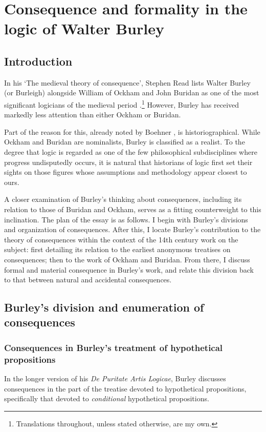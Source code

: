 \chapter[Consequence and formality in Burley]{Consequence and formality in the logic of Walter Burley}
	\section{Introduction}
	In his `The medieval theory of consequence', Stephen Read lists Walter Burley (or Burleigh) alongside William of Ockham and John Buridan as one of the most significant logicians of the medieval period .\footnote{\cite[p. 900]{Read2012} Translations throughout, unless stated otherwise, are my own.} However, Burley has received markedly less attention than either Ockham or Buridan. 
	
	Part of the reason for this, already noted by Boehner \autocite[p. VI]{Boehner1955}, is historiographical. While Ockham and Buridan are nominalists, Burley is classified as a realist. To the degree that logic is regarded as one of the few philosophical subdisciplines where progress undisputedly occurs, it is natural that historians of logic first set their sights on those figures whose assumptions and methodology appear closest to ours. 
	
	A closer examination of Burley's thinking about consequences, including its relation to those of Buridan and Ockham, serves as a fitting counterweight to this inclination. The plan of the essay is as follows. I begin with Burley's divisions and organization of consequences. After this, I locate Burley's contribution to the theory of consequences within the context of the 14th century work on the subject: first detailing its relation to the earliest anonymous treatises on consequences; then to the work of Ockham and Buridan. From there, I discuss formal and material consequence in Burley's work, and relate this division back to that between natural and accidental consequences.
	\section{Burley's division and enumeration of consequences}
	\subsection{Consequences in Burley's treatment of hypothetical propositions}
	In the longer version of his \textit{De Puritate Artis Logicae}, Burley discusses consequences in the part of the treatise devoted to hypothetical propositions, specifically that devoted to \textit{conditional} hypothetical propositions.
	

